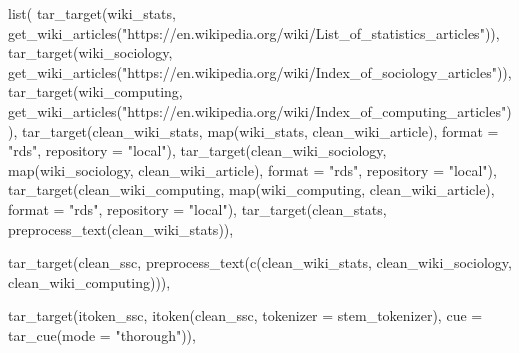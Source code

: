 \documentclass[
  letterpaper,
  DIV=11,
  numbers=noendperiod]{scrreport}
\newenvironment{Shaded}{\begin{snugshade}}{\end{snugshade}}
\newcommand{\AttributeTok}[1]{\textcolor[rgb]{0.40,0.45,0.13}{#1}}
\newcommand{\FunctionTok}[1]{\textcolor[rgb]{0.28,0.35,0.67}{#1}}
\newcommand{\NormalTok}[1]{\textcolor[rgb]{0.00,0.23,0.31}{#1}}
\newcommand{\StringTok}[1]{\textcolor[rgb]{0.13,0.47,0.30}{#1}}
\begin{document}
\begin{Shaded}
\begin{Highlighting}[]
\FunctionTok{list}\NormalTok{(}
  \FunctionTok{tar\_target}\NormalTok{(wiki\_stats, }\FunctionTok{get\_wiki\_articles}\NormalTok{(}\StringTok{"https://en.wikipedia.org/wiki/List\_of\_statistics\_articles"}\NormalTok{)),}
  \FunctionTok{tar\_target}\NormalTok{(wiki\_sociology, }\FunctionTok{get\_wiki\_articles}\NormalTok{(}\StringTok{"https://en.wikipedia.org/wiki/Index\_of\_sociology\_articles"}\NormalTok{)),}
  \FunctionTok{tar\_target}\NormalTok{(wiki\_computing, }\FunctionTok{get\_wiki\_articles}\NormalTok{(}\StringTok{"https://en.wikipedia.org/wiki/Index\_of\_computing\_articles"}\NormalTok{)),}
  \FunctionTok{tar\_target}\NormalTok{(clean\_wiki\_stats, }\FunctionTok{map}\NormalTok{(wiki\_stats, clean\_wiki\_article), }\AttributeTok{format =} \StringTok{"rds"}\NormalTok{, }\AttributeTok{repository =} \StringTok{"local"}\NormalTok{),}
  \FunctionTok{tar\_target}\NormalTok{(clean\_wiki\_sociology, }\FunctionTok{map}\NormalTok{(wiki\_sociology, clean\_wiki\_article), }\AttributeTok{format =} \StringTok{"rds"}\NormalTok{, }\AttributeTok{repository =} \StringTok{"local"}\NormalTok{),}
  \FunctionTok{tar\_target}\NormalTok{(clean\_wiki\_computing, }\FunctionTok{map}\NormalTok{(wiki\_computing, clean\_wiki\_article), }\AttributeTok{format =} \StringTok{"rds"}\NormalTok{, }\AttributeTok{repository =} \StringTok{"local"}\NormalTok{),}
  \FunctionTok{tar\_target}\NormalTok{(clean\_stats, }\FunctionTok{preprocess\_text}\NormalTok{(clean\_wiki\_stats)),}
  
  \FunctionTok{tar\_target}\NormalTok{(clean\_ssc, }\FunctionTok{preprocess\_text}\NormalTok{(}\FunctionTok{c}\NormalTok{(clean\_wiki\_stats, clean\_wiki\_sociology, clean\_wiki\_computing))),}
  
  \FunctionTok{tar\_target}\NormalTok{(itoken\_ssc, }\FunctionTok{itoken}\NormalTok{(clean\_ssc, }\AttributeTok{tokenizer =}\NormalTok{ stem\_tokenizer),}
             \AttributeTok{cue =} \FunctionTok{tar\_cue}\NormalTok{(}\AttributeTok{mode =} \StringTok{"thorough"}\NormalTok{)),}
 

\end{Highlighting}
\end{Shaded}
\end{document}
